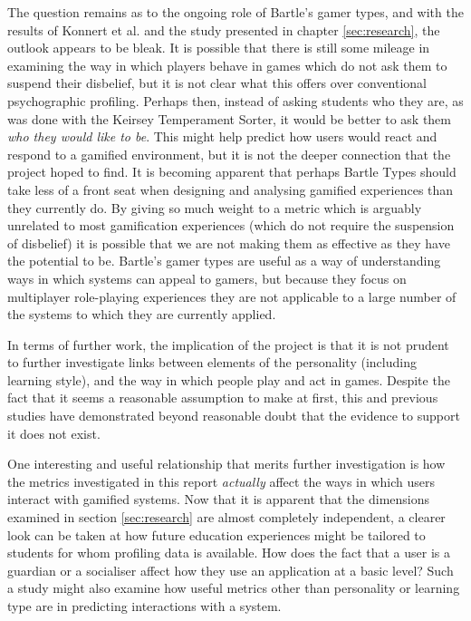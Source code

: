 \documentclass[12pt,a4paper,twoside]{report}
\begin{document}
The question remains as to the ongoing role of Bartle's gamer types, and with the results of Konnert et al. \cite{konertmodeling} and the study presented in chapter \ref{sec:research}, the outlook appears to be bleak. It is possible that there is still some mileage in examining the way in which players behave in games which do not ask them to suspend their disbelief, but it is not clear what this offers over conventional psychographic profiling. Perhaps then, instead of asking students who they are, as was done with the Keirsey Temperament Sorter, it would be better to ask them \textit{who they would like to be}. This might help predict how users would react and respond to a gamified environment, but it is not the deeper connection that the project hoped to find. It is becoming apparent that perhaps Bartle Types should take less of a front seat when designing and analysing gamified experiences than they currently do. By giving so much weight to a metric which is arguably unrelated to most gamification experiences (which do not require the suspension of disbelief) it is possible that we are not making them as effective as they have the potential to be. Bartle's gamer types are useful as a way of understanding ways in which systems can appeal to gamers, but because they focus on multiplayer role-playing experiences they are not applicable to a large number of the systems to which they are currently applied.

In terms of further work, the implication of the project is that it is not prudent to further investigate links between elements of the personality (including learning style), and the way in which people play and act in games. Despite the fact that it seems a reasonable assumption to make at first, this and previous studies have demonstrated beyond reasonable doubt that the evidence to support it does not exist.

One interesting and useful relationship that merits further investigation is how the metrics investigated in this report \textit{actually} affect the ways in which users interact with gamified systems. Now that it is apparent that the dimensions examined in section \ref{sec:research} are almost completely independent, a clearer look can be taken at how future education experiences might be tailored to students for whom profiling data is available. How does the fact that a user is a guardian or a socialiser affect how they use an application at a basic level? Such a study might also examine how useful metrics other than personality or learning type are in predicting interactions with a system.
\end{document}
